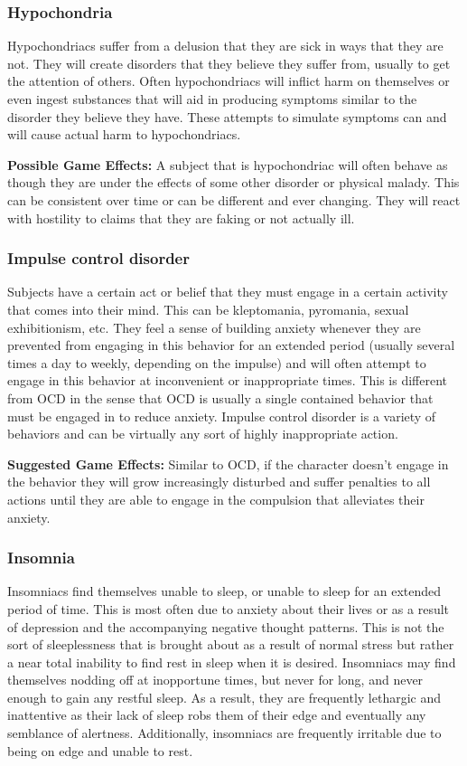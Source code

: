 \subsubsection{Hypochondria}

Hypochondriacs suffer from a delusion that they are sick in ways that they are not. They will create disorders that they believe they suffer from, usually to get the attention of others. Often hypochondriacs will inflict harm on themselves or even ingest substances that will aid in producing symptoms similar to the disorder they believe they have. These attempts to simulate symptoms can and will cause actual harm to hypochondriacs.

\textbf{Possible Game Effects:} A subject that is hypochondriac will often behave as though they are under the effects of some other disorder or physical malady. This can be consistent over time or can be different and ever changing. They will react with hostility to claims that they are faking or not actually ill.

\subsubsection{Impulse control disorder}

Subjects have a certain act or belief that they must engage in a certain activity that comes into their mind. This can be kleptomania, pyromania, sexual exhibitionism, etc. They feel a sense of building anxiety whenever they are prevented from engaging in this behavior for an extended period (usually several times a day to weekly, depending on the impulse) and will often attempt to engage in this behavior at inconvenient or inappropriate times. This is different from OCD in the sense that OCD is usually a single contained behavior that must be engaged in to reduce anxiety. Impulse control disorder is a variety of behaviors and can be virtually any sort of highly inappropriate action.

\textbf{Suggested Game Effects:} Similar to OCD, if the character doesn’t engage in the behavior they will grow increasingly disturbed and suffer penalties to all actions until they are able to engage in the compulsion that alleviates their anxiety.

\subsubsection{Insomnia}

Insomniacs find themselves unable to sleep, or unable to sleep for an extended period of time. This is most often due to anxiety about their lives or as a result of depression and the accompanying negative thought patterns. This is not the sort of sleeplessness that is brought about as a result of normal stress but rather a near total inability to find rest in sleep when it is desired. Insomniacs may find themselves nodding off at inopportune times, but never for long, and never enough to gain any restful sleep. As a result, they are frequently lethargic and inattentive as their lack of sleep robs them of their edge and eventually any semblance of alertness. Additionally, insomniacs are frequently irritable due to being on edge and unable to rest.

